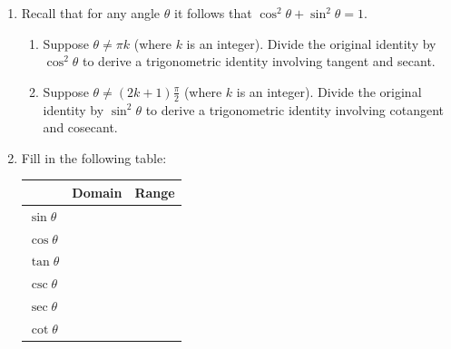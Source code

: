\documentclass[12pt]{article}
\newif\ifans
\begin{document}
\begin{enumerate}
\item Recall that for any angle $\theta$ it follows that $\cos^2\theta+\sin^2\theta=1$.  

\begin{enumerate}

\item Suppose $\theta\neq\pi k$ (where $k$ is an integer).  Divide the original identity by $\cos^2\theta$ to derive a trigonometric identity involving tangent and secant.

\ifans\fbox{\parbox{1\linewidth}{Suppose $\theta\neq\pi k$ (where $k$ is an integer).  Then, it follows that $\cos{\theta}\neq 0$ and we may divide by $\cos{\theta}$.
\begin{align*}
\cos^2\theta+\sin^2\theta&=1\\
\frac{\cos^2\theta+\sin^2\theta}{\cos^2\theta} &=\frac{1}{\cos^2\theta} && \text{Divide both sides by $\cos^2\theta$}\\
1+\left(\frac{\sin\theta}{\cos\theta}\right)^2&=\left(\frac{1}{\cos\theta}\right)^2 && \\
1+\tan^2\theta&=\sec^2\theta && \text{By definition of tangent and secant}
\end{align*}
Thus, $1+\tan^2\theta=\sec^2\theta$.
}} \fi

\item Suppose $\theta\neq(2k+1)\frac{\pi}{2}$ (where $k$ is an integer).  Divide the original identity by $\sin^2\theta$ to derive a trigonometric identity involving cotangent and cosecant.

\ifans\fbox{$\cot^2\theta+1=\csc^2\theta$} \fi

\end{enumerate}

\item Fill in the following table:
\begin{center}
\begin{tabular}{l|c|c}
& Domain & Range\\
\hline
$\sin{\theta}$ & &\\
\hline
$\cos{\theta}$ & &\\
\hline
$\tan{\theta}$ & &\\
\hline
$\csc{\theta}$ & &\\
\hline
$\sec{\theta}$ & &\\
\hline
$\cot{\theta}$ & &
\end{tabular}
\end{center}


\end{enumerate}
\end{document}

